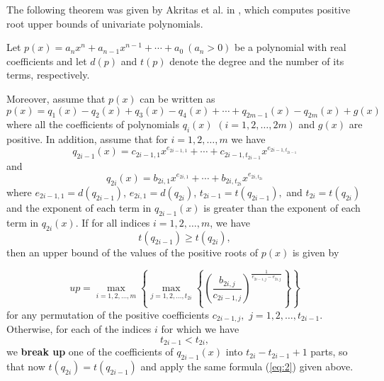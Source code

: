 The following theorem was given by Akritas et al. in  \cite{akr08}, which computes positive root upper bounds of univariate polynomials.

\begin{theorem} \label{thm:qup}

  Let $p(x)=a_nx^n+a_{n-1}x^{n-1}+\cdots+a_0\ (a_n>0)$ be a polynomial with real coefficients and let $d(p)$ and $t(p)$ denote the degree and the number of its terms, respectively.

  Moreover, assume that $p(x)$ can be written as\begin{equation}
	p(x)=q_1(x)-q_2(x)+q_3(x)-q_4(x)+\cdots +q_{2m-1}(x)-q_{2m}(x)+g(x)
	\label{eq:1}
  \end{equation}
  where all the coefficients of polynomials $q_i(x)$ $(i=1,2,\ldots,2m)$ and $g(x)$ are positive. In addition,
  assume that for $i=1,2,\ldots,m$ we have
  \begin{equation*}
	q_{2i-1}(x)=c_{2i-1,1}x^{e_{2i-1,1}}+\cdots+c_{2i-1,t_{2i-1}}x^{e_{2i-1,t_{2i-1}}}
  \end{equation*}
  and
  \begin{equation*}
	q_{2i}(x)=b_{2i,1}x^{e_{2i,1}}+\cdots+b_{2i,t_{2i}}x^{e_{2i,t_{2i}}}
  \end{equation*}
  where $e_{2i-1,1}=d(q_{2i-1})$, $e_{2i,1}=d(q_{2i})$, $t_{2i-1}=t(q_{2i-1}),$ and $t_{2i}=t(q_{2i})$   and the exponent of each term in $q_{2i-1}(x)$ is greater than the exponent of each term in $q_{2i}(x)$. If for all indices $i=1,2,\ldots,m$, we have
  \begin{equation*}
	t(q_{2i-1})\ge t(q_{2i}),
  \end{equation*}
  then an upper bound of the values of the positive roots of $p(x)$ is given by

  \begin{equation}\label{eq:2}
	up= \max_{i=1,2,\ldots,m}\left\{ \max_{j=1,2,\ldots,t_{2i}}\left\{ \left( \frac{b_{2i,j}}{c_{2i-1,j}} \right)^{\frac{1}{e_{2i-1,j}- e_{2i,j} } } \right\}  \right\}
  \end{equation}
  for any permutation of the positive coefficients $c_{2i-1,j}, $ $j=1,2,\ldots,t_{2i-1}$.
  Otherwise, for each of the indices $i$ for which we have
  \begin{equation*}
	t_{2i-1}<t_{2i},
  \end{equation*}
  we {\bf break up} one of the coefficients of $q_{2i-1}(x)$ into $t_{2i}-t_{2i-1} +1$ parts, so that now $t(q_{2i} ) = t(q_{2i-1})$ and apply the same formula (\ref{eq:2}) given above.


\end{theorem}


